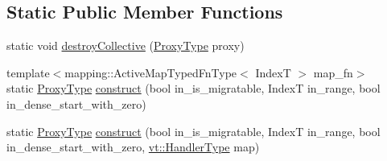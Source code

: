 \subsection*{Static Public Member Functions}
\begin{DoxyCompactItemize}
\item 
static void \hyperlink{structvt_1_1rdma_1_1_sub_handle_a1c85a7f35e134ae88ee2ee74ea3e64f2}{destroy\+Collective} (\hyperlink{structvt_1_1rdma_1_1_sub_handle_a758bee2e499658cfef92ace83eea6590}{Proxy\+Type} proxy)
\item 
{\footnotesize template$<$mapping\+::\+Active\+Map\+Typed\+Fn\+Type$<$ Index\+T $>$ map\+\_\+fn$>$ }\\static \hyperlink{structvt_1_1rdma_1_1_sub_handle_a758bee2e499658cfef92ace83eea6590}{Proxy\+Type} \hyperlink{structvt_1_1rdma_1_1_sub_handle_a804b2836bdb4b3ce26d9180cb775993c}{construct} (bool in\+\_\+is\+\_\+migratable, IndexT in\+\_\+range, bool in\+\_\+dense\+\_\+start\+\_\+with\+\_\+zero)
\item 
static \hyperlink{structvt_1_1rdma_1_1_sub_handle_a758bee2e499658cfef92ace83eea6590}{Proxy\+Type} \hyperlink{structvt_1_1rdma_1_1_sub_handle_a6c2f157dfe0ab8af4e049d2039667906}{construct} (bool in\+\_\+is\+\_\+migratable, IndexT in\+\_\+range, bool in\+\_\+dense\+\_\+start\+\_\+with\+\_\+zero, \hyperlink{namespacevt_af64846b57dfcaf104da3ef6967917573}{vt\+::\+Handler\+Type} map)
\end{DoxyCompactItemize}
